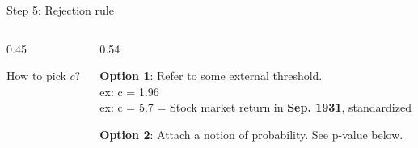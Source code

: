 \documentclass[9pt,english,aspectratio=169]{beamer}
\begin{document}
%
\begin{frame}{Step 5: Rejection rule}

  \vspace{0.2em}
  \begin{center}
  \end{center}


   \begin{columns}[T]
    \begin{column}{0.45\textwidth}
      \vspace{0.2em}
    \begin{questionbox}
        How to pick $c$?
      \end{questionbox}
      \pause 
    \end{column}
    \begin{column}{0.54\textwidth}
     \vspace{0.4em}
      \begin{insightbox}
        \textbf{Option 1}: Refer to some external threshold. \\ 
        ex: c = 1.96 \\ 
        ex: c = 5.7 = Stock market return in \textbf{Sep. 1931}, standardized
      \end{insightbox}
      \pause 
      \begin{insightbox}
        \textbf{Option 2}: Attach a notion of probability. See p-value below. 
      \end{insightbox}
    \end{column}
  \end{columns}

\end{frame}
\end{document}

